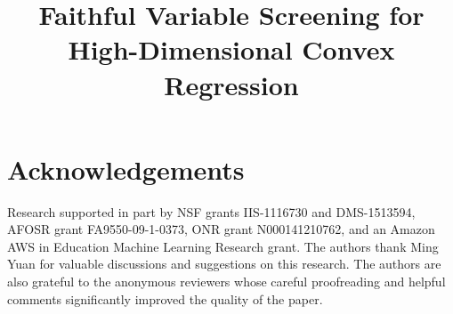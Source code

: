 \documentclass[12pt,pdftex,aos,addressasfootnote,noinfoline]{imsart}
\begin{document}
\begin{frontmatter}
\title{Faithful Variable Screening for\\ High-Dimensional Convex Regression}


 
\vskip20pt 
\end{frontmatter}

\maketitle

\vskip10pt










%


\section*{Acknowledgements}
Research supported in part by NSF grants IIS-1116730 and DMS-1513594,
AFOSR grant FA9550-09-1-0373, ONR grant N000141210762, and an Amazon
AWS in Education Machine Learning Research grant. The authors 
thank  Ming Yuan for valuable discussions and suggestions
on this research. The authors are also grateful to the anonymous
reviewers whose careful proofreading and helpful comments significantly
improved the quality of the paper.





% 
\end{document}
